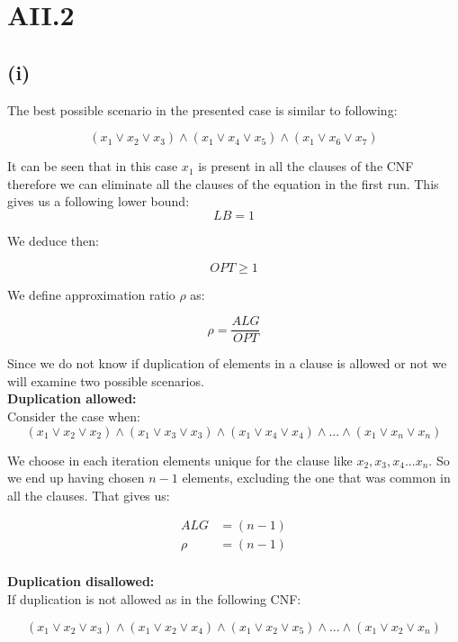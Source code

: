 \section* {AII.2}
\label {a2-2}
\subsection*{(i)}

The best possible scenario in the presented case is similar to following:

$$ (x_1 \vee x_2  \vee x_3) \wedge (x_1 \vee x_4 \vee x_5) \wedge (x_1 \vee x_6 \vee x_7) $$

It can be seen that in this case $ x_1 $ is present in all the clauses of the CNF therefore we can eliminate all the clauses of the equation in the first run. This gives us a following lower bound:
$$ LB = 1 $$ 

We deduce then:

$$ OPT \ge 1 $$

We define approximation ratio $ \rho $ as:

$$ \rho = \frac{ALG}{OPT} $$

Since we do not know if duplication of elements in a clause is allowed or not we will examine two possible scenarios.\\

\textbf{Duplication allowed:}\\

Consider the case when:\\

$$ (x_1 \vee x_2  \vee x_2) \wedge (x_1 \vee x_3 \vee x_3) \wedge (x_1 \vee x_4 \vee x_4) \wedge ... \wedge (x_1 \vee x_n \vee x_n) $$

We choose in each iteration elements unique for the clause like $ x_2 , x_3 , x_4 ... x_n $. So we end up having chosen $ n -1  $ elements, excluding the one that was common in all the clauses. That gives us:

\begin{align*}
	ALG &= (n-1)\\
	\rho &= (n-1) \\
\end{align*}

\textbf{Duplication disallowed:}\\

If duplication is not allowed as in the following CNF:

$$ (x_1 \vee x_2  \vee x_3) \wedge (x_1 \vee x_2 \vee x_4) \wedge (x_1 \vee x_2 \vee x_5) \wedge ... \wedge (x_1 \vee x_2 \vee x_n) $$

